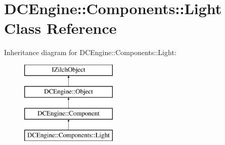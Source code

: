 \hypertarget{classDCEngine_1_1Components_1_1Light}{\section{D\-C\-Engine\-:\-:Components\-:\-:Light Class Reference}
\label{classDCEngine_1_1Components_1_1Light}
}
Inheritance diagram for D\-C\-Engine\-:\-:Components\-:\-:Light\-:\begin{figure}[H]
\begin{center}
\leavevmode
\includegraphics[height=4.000000cm]{classDCEngine_1_1Components_1_1Light}
\end{center}
\end{figure}
